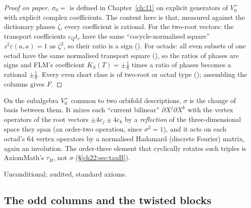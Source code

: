\begin{proof}[Proof on paper]
$\sigma_0=$  is defined in Chapter~\ref{ch:11} on explicit generators of $V_0^+$ with explicit complex
coefficients.  The content here is that, measured against the dictionary phases $\zeta$, every coefficient is rational.
For the two-root vectors: the transport coefficients $c_Q t_c$ have the same ``cocycle-normalised square''
$z^2\varepsilon(a,a)=1$ as $\zeta^2$, so their ratio is a sign ().  For octads: all even subsets of
one octad have the same normalised transport square (), so the ratios of phases are signs and
FLM's coefficient $K_S(T)=\pm\tfrac18$ times a ratio of phases becomes a rational $\pm\tfrac18$.  Every even short class is of
two-root or octad type (); assembling the columns gives $F$.
\end{proof}
\begin{physics}
On the subalgebra $V_0^+$ common to two orbifold descriptions, $\sigma$ is the change of basis between them.  It mixes
each ``current bilinear'' $\partial X^j\partial X^k$ with the vertex operators of the root vectors $\pm4e_j\pm4e_k$ by a
\emph{reflection} of the three-dimensional space they span (an order-two operation, since $\sigma^2=1$), and it acts on
each octad's $64$ vertex operators by a normalised Hadamard (discrete Fourier) matrix, again an involution.  The order-three
element that cyclically rotates such triples is AxiomMath's $\tau_B$, not $\sigma$ (\S\ref{ch22:sec:tauB}).
\end{physics}
\begin{status}Unconditional; audited, standard axioms.\end{status}


\subsection{The odd columns and the twisted blocks}

